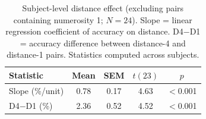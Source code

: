\begin{table}[ht]
  \centering
  \small
  \caption{Subject-level distance effect (excluding pairs containing
  numerosity 1; $N = 24$). Slope = linear regression coefficient of accuracy
  on distance. D4$-$D1 = accuracy difference between distance-4 and distance-1
  pairs. Statistics computed across subjects.}
  \label{tab:distance-ladder}
  \begin{tabular}{lcccc}
    \toprule
    Statistic & Mean & SEM & $t(23)$ & $p$ \\
    \midrule
    Slope (\%/unit) & 0.78 & 0.17 & 4.63 & $<$0.001 \\
    D4$-$D1 (\%) & 2.36 & 0.52 & 4.52 & $<$0.001 \\
    \bottomrule
  \end{tabular}
\end{table}
